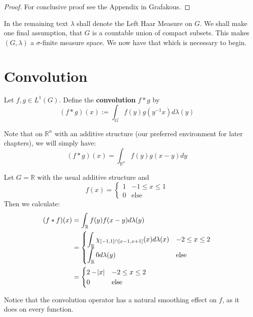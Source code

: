 \begin{proof}
For conclusive proof see the Appendix in Grafakous.
\end{proof}

In the remaining text $\lambda$ shall denote the Left Haar Measure on $G$. We shall make one final assumption, that $G$ is a countable union of compact subsets. This makes $(G,\lambda)$ a $\sigma$-finite measure space. We now have that which is necessary to begin.
	
\section{Convolution}

\begin{definition}
 Let $f,g \in L^1(G)$. Define the \textbf{convolution} $f*g$ by
\begin{equation}
 (f*g)(x) := \int_G f(y)g(y^{-1}x) d\lambda(y)
\end{equation}
\end{definition}

\begin{remark}
Note that on $\mathbb{R}^n$ with an additive structure (our preferred environment for later chapters), we will simply have:
\begin{equation*}
 (f*g)(x) = \int_{\mathbb{R}^n} f(y)g(x-y) dy
\end{equation*}
\end{remark}

\begin{example}
Let $G = \mathbb{R}$ with the usual additive structure and 
\begin{equation}
f(x) = \begin{cases}
1 & -1 \leq x \leq 1 \\
0 & \text{else}
\end{cases}
\end{equation}
Then we calculate:
\begin{align*}
(f \ast f)(x) &= \int_\mathbb{R} f(y)f(x-y) d\lambda(y) \\
&= 
\begin{cases}
\displaystyle
\int_\mathbb{R} \chi_{\intcc{-1,1}\cap\intcc{x-1,x+1}}(x) d\lambda(x) & -2 \leq x \leq 2 \\
\displaystyle
\int_\mathbb{R} 0 d\lambda(y) & \text{else}
\end{cases} \\
&= 
\begin{cases}
\displaystyle
2-\abs{x} & -2 \leq x \leq 2 \\
\displaystyle
0 & \text{else}
\end{cases} 
\end{align*}

Notice that the convolution operator has a natural smoothing effect on $f$, as it does on every function.

\end{example}

